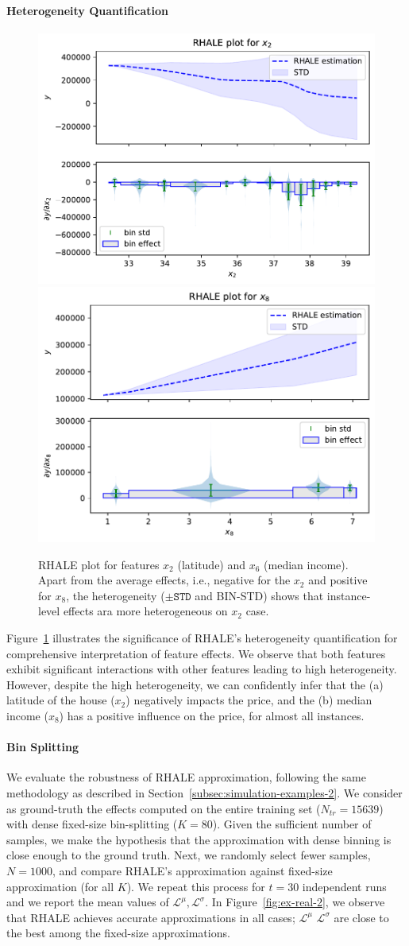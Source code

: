 \documentclass{ecai}  %
\newcommand{\paragraphb}{\vspace{-0.25cm}\paragraph}
\begin{document}
\paragraphb{Heterogeneity Quantification}
%
\begin{figure}[h]
  \centering
  \includegraphics[width=.23\textwidth]{real_dataset_3/feature_1_ale_auto}
  \includegraphics[width=.23\textwidth]{real_dataset_3/feature_7_ale_auto}
  \caption{RHALE plot for features \(x_2\) (latitude) and \(x_6\)
    (median income). Apart from the average effects, i.e., negative
    for the \(x_2\) and positive for \(x_8\), the heterogeneity
    (\(\pm \mathtt{STD}\) and BIN-STD) shows that instance-level
    effects ara more heterogeneous on \(x_2\) case.}
  \label{fig:ex-real-1}
\end{figure}
%
Figure~\ref{fig:ex-real-1} illustrates the significance of RHALE's
heterogeneity quantification for comprehensive interpretation of
feature effects. We observe that both features exhibit significant
interactions with other features leading to high heterogeneity.
However, despite the high heterogeneity, we can confidently infer that
the (a) latitude of the house (\(x_2\)) negatively impacts the price,
and the (b) median income (\(x_8\)) has a positive influence on the
price, for almost all instances.

\paragraphb{Bin Splitting}
We evaluate the robustness of RHALE approximation, following the same
methodology as described in
Section~\ref{subsec:simulation-examples-2}.  We consider as
ground-truth the effects computed on the entire training set
(\(N_{tr}=15639\)) with dense fixed-size bin-splitting
(\(K=80\)). Given the sufficient number of samples, we make the
hypothesis that the approximation with dense binning is close enough
to the ground truth. Next, we randomly select fewer samples,
\(N=1000\), and compare RHALE's approximation against fixed-size
approximation (for all \(K\)).  We repeat this process for \(t=30\)
independent runs and we report the mean values of
\(\mathcal{L}^{\mu}, \mathcal{L}^{\sigma}\).  In
Figure~\ref{fig:ex-real-2}, we observe that RHALE achieves accurate
approximations in all cases; \(\mathcal{L}^\mu\)
\(\mathcal{L}^\sigma\) are close to the best among the fixed-size
approximations.
\end{document}
